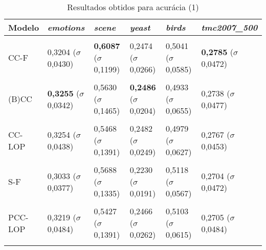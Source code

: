 
\begin{table}[htbp]
	\centering
	\caption{Resultados obtidos para acurácia (1)}
		\begin{tabular}
        { p{0.88in} p{0.88in} p{0.88in} p{0.88in} p{0.88in} p{0.88in} }
        
        \hline
Modelo & \textit{emotions} & \textit{scene} & \textit{yeast} & \textit{birds} & \textit{tmc2007\_500} \\ 
\hline \\

CC-F & 0,3204 \newline ($\sigma$ 0,0430) & \textbf{0,6087} \newline ($\sigma$ 0,1199) & 0,2474 \newline ($\sigma$ 0,0266) & 0,5041 \newline ($\sigma$ 0,0585) & \textbf{0,2785} \newline ($\sigma$ 0,0472) \\ \\
(B)CC & \textbf{0,3255} \newline ($\sigma$ 0,0342) & 0,5630 \newline ($\sigma$ 0,1465) & \textbf{0,2486} \newline ($\sigma$ 0,0204) & 0,4933 \newline ($\sigma$ 0,0655) & 0,2738 \newline ($\sigma$ 0,0477) \\ \\
CC-LOP & 0,3254 \newline ($\sigma$ 0,0438) & 0,5468 \newline ($\sigma$ 0,1391) & 0,2482 \newline ($\sigma$ 0,0249) & 0,4979 \newline ($\sigma$ 0,0627) & 0,2767 \newline ($\sigma$ 0,0453) \\ \\
S-F & 0,3033 \newline ($\sigma$ 0,0377) & 0,5688 \newline ($\sigma$ 0,1335) & 0,2230 \newline ($\sigma$ 0,0191) & 0,5118 \newline ($\sigma$ 0,0567) & 0,2704 \newline ($\sigma$ 0,0472) \\ \\
PCC-LOP & 0,3219 \newline ($\sigma$ 0,0484) & 0,5427 \newline ($\sigma$ 0,1391) & 0,2466 \newline ($\sigma$ 0,0262) & 0,5103 \newline ($\sigma$ 0,0615) & 0,2705 \newline ($\sigma$ 0,0484) \\ \\

\end{tabular}
\end{table}
